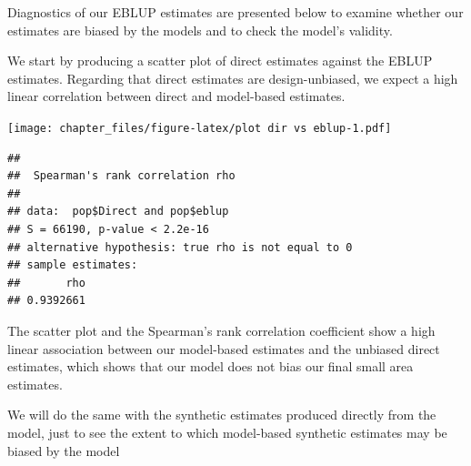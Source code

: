 \documentclass[
]{article}
\newenvironment{Shaded}{\begin{snugshade}}{\end{snugshade}}
\newcommand{\CommentTok}[1]{\textcolor[rgb]{0.56,0.35,0.01}{\textit{#1}}}
\newcommand{\DataTypeTok}[1]{\textcolor[rgb]{0.13,0.29,0.53}{#1}}
\newcommand{\KeywordTok}[1]{\textcolor[rgb]{0.13,0.29,0.53}{\textbf{#1}}}
\newcommand{\NormalTok}[1]{#1}
\newcommand{\OperatorTok}[1]{\textcolor[rgb]{0.81,0.36,0.00}{\textbf{#1}}}
\newcommand{\StringTok}[1]{\textcolor[rgb]{0.31,0.60,0.02}{#1}}
\begin{document}
Diagnostics of our EBLUP estimates are presented below to examine
whether our estimates are biased by the models and to check the model's
validity.

We start by producing a scatter plot of direct estimates against the
EBLUP estimates. Regarding that direct estimates are design-unbiased, we
expect a high linear correlation between direct and model-based
estimates.

\begin{Shaded}
\end{Shaded}

\texttt{[image: chapter\_files/figure-latex/plot dir vs eblup-1.pdf]}

\begin{Shaded}
\end{Shaded}

\begin{verbatim}
## 
##  Spearman's rank correlation rho
## 
## data:  pop$Direct and pop$eblup
## S = 66190, p-value < 2.2e-16
## alternative hypothesis: true rho is not equal to 0
## sample estimates:
##       rho 
## 0.9392661
\end{verbatim}

The scatter plot and the Spearman's rank correlation coefficient show a
high linear association between our model-based estimates and the
unbiased direct estimates, which shows that our model does not bias our
final small area estimates.

We will do the same with the synthetic estimates produced directly from
the model, just to see the extent to which model-based synthetic
estimates may be biased by the model

\begin{Shaded}
\end{Shaded}
\end{document}
